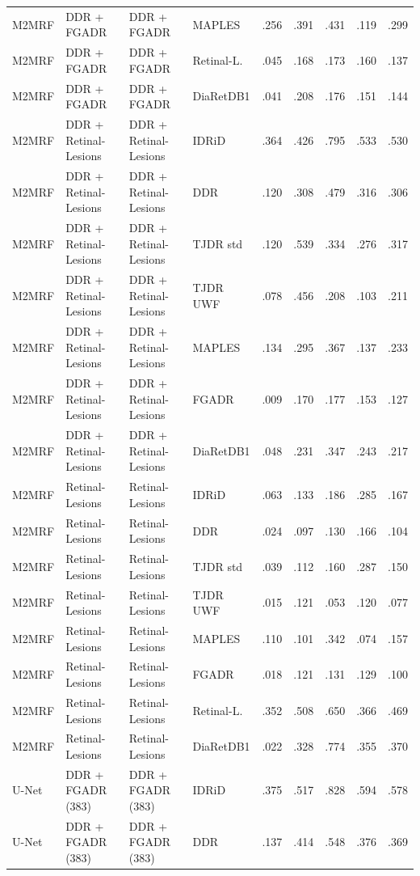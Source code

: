 \begin{landscape}
{\begin{longtable}{l l l l c c c c c}
M2MRF & DDR + FGADR & DDR + FGADR & MAPLES & .256 & .391 & .431 & .119 & .299 \\
M2MRF & DDR + FGADR & DDR + FGADR & Retinal-L. & .045 & .168 & .173 & .160 & .137 \\
M2MRF & DDR + FGADR & DDR + FGADR & DiaRetDB1 & .041 & .208 & .176 & .151 & .144 \\
M2MRF & DDR + Retinal-Lesions & DDR + Retinal-Lesions & IDRiD & .364 & .426 & .795 & .533 & .530 \\
M2MRF & DDR + Retinal-Lesions & DDR + Retinal-Lesions & DDR & .120 & .308 & .479 & .316 & .306 \\
M2MRF & DDR + Retinal-Lesions & DDR + Retinal-Lesions & TJDR std & .120 & .539 & .334 & .276 & .317 \\
M2MRF & DDR + Retinal-Lesions & DDR + Retinal-Lesions & TJDR UWF & .078 & .456 & .208 & .103 & .211 \\
M2MRF & DDR + Retinal-Lesions & DDR + Retinal-Lesions & MAPLES & .134 & .295 & .367 & .137 & .233 \\
M2MRF & DDR + Retinal-Lesions & DDR + Retinal-Lesions & FGADR & .009 & .170 & .177 & .153 & .127 \\
M2MRF & DDR + Retinal-Lesions & DDR + Retinal-Lesions & DiaRetDB1 & .048 & .231 & .347 & .243 & .217 \\
M2MRF & Retinal-Lesions & Retinal-Lesions & IDRiD & .063 & .133 & .186 & .285 & .167 \\
M2MRF & Retinal-Lesions & Retinal-Lesions & DDR & .024 & .097 & .130 & .166 & .104 \\
M2MRF & Retinal-Lesions & Retinal-Lesions & TJDR std & .039 & .112 & .160 & .287 & .150 \\
M2MRF & Retinal-Lesions & Retinal-Lesions & TJDR UWF & .015 & .121 & .053 & .120 & .077 \\
M2MRF & Retinal-Lesions & Retinal-Lesions & MAPLES & .110 & .101 & .342 & .074 & .157 \\
M2MRF & Retinal-Lesions & Retinal-Lesions & FGADR & .018 & .121 & .131 & .129 & .100 \\
M2MRF & Retinal-Lesions & Retinal-Lesions & Retinal-L. & .352 & .508 & .650 & .366 & .469 \\
M2MRF & Retinal-Lesions & Retinal-Lesions & DiaRetDB1 & .022 & .328 & .774 & .355 & .370 \\
U-Net & DDR + FGADR (383) & DDR + FGADR (383) & IDRiD & .375 & .517 & .828 & .594 & .578 \\
U-Net & DDR + FGADR (383) & DDR + FGADR (383) & DDR & .137 & .414 & .548 & .376 & .369 \\

\end{longtable}}
\end{landscape}
